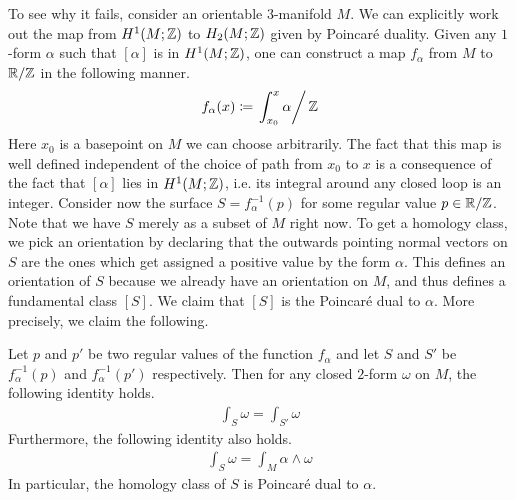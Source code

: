 To see why it fails, consider an orientable $3$-manifold $M$. We can explicitly work out the map
from $H^1(M; \mathbb{Z})$ to $H_2(M; \mathbb{Z})$ given by Poincar\'e duality. Given any $1$-form $\alpha$ such
that $[\alpha]$ is in $H^1(M; \mathbb{Z})$, one can construct a map $f_{\alpha}$ from $M$ to $\mathbb{R}/\mathbb{Z}$ in
the following manner.
\begin{align*}
  f_{\alpha}(x) \coloneqq \left. \int_{x_0}^x \alpha \right/ \mathbb{Z}
\end{align*}
Here $x_0$ is a basepoint on $M$ we can choose arbitrarily. The fact that this map is well defined
independent of the choice of path from $x_0$ to $x$ is a consequence of the fact that $[\alpha]$
lies in $H^1(M; \mathbb{Z})$, i.e.  its integral around any closed loop is an integer. Consider now the
surface $S = f_{\alpha}^{-1}(p)$ for some regular value $p \in \mathbb{R}/\mathbb{Z}$. Note that we have $S$
merely as a subset of $M$ right now. To get a homology class, we pick an orientation by declaring
that the outwards pointing normal vectors on $S$ are the ones which get assigned a positive value
by the form $\alpha$. This defines an orientation of $S$ because we already have an orientation on
$M$, and thus defines a fundamental class $[S]$. We claim that $[S]$ is the Poincar\'e dual to
$\alpha$. More precisely, we claim the following.
\begin{claim}
  Let $p$ and $p'$ be two regular values of the function $f_{\alpha}$ and let $S$ and $S'$ be
  $f_{\alpha}^{-1}(p)$ and $f^{-1}_{\alpha}(p')$ respectively. Then for any closed $2$-form $\omega$ on $M$, the following
  identity holds.
  \begin{align*}
    \int_{S} \omega = \int_{S'} \omega
  \end{align*}
  Furthermore, the following identity also holds.
  \begin{align*}
    \int_S \omega = \int_M \alpha \wedge \omega
  \end{align*}
  In particular, the homology class of $S$ is Poincar\'e dual to $\alpha$.
\end{claim}
